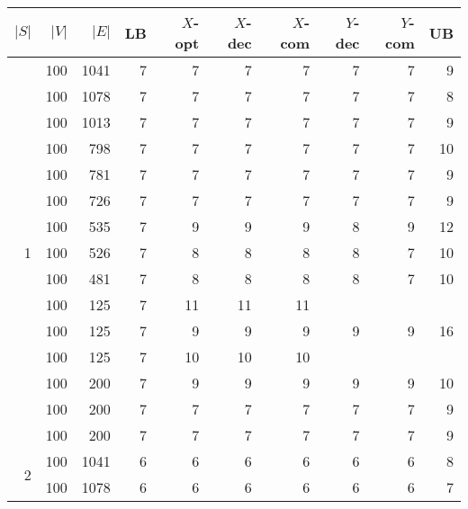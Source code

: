 \begin{table}[]
\begin{tabular}{rrrrrrrrrr}
$|S|$               & $|V|$ & $|E|$ & LB & $X$-opt & $X$-dec & $X$-com & $Y$-dec & $Y$-com & UB \\\hline
\multirow{15}{*}{1} & 100   & 1041  & 7  & 7       & 7       & 7       & 7       & 7       & 9  \\
                    & 100   & 1078  & 7  & 7       & 7       & 7       & 7       & 7       & 8  \\
                    & 100   & 1013  & 7  & 7       & 7       & 7       & 7       & 7       & 9  \\
                    & 100   & 798   & 7  & 7       & 7       & 7       & 7       & 7       & 10 \\
                    & 100   & 781   & 7  & 7       & 7       & 7       & 7       & 7       & 9  \\
                    & 100   & 726   & 7  & 7       & 7       & 7       & 7       & 7       & 9  \\
                    & 100   & 535   & 7  & 9       & 9       & 9       & 8       & 9       & 12 \\
                    & 100   & 526   & 7  & 8       & 8       & 8       & 8       & 7       & 10 \\
                    & 100   & 481   & 7  & 8       & 8       & 8       & 8       & 7       & 10 \\
                    & 100   & 125   & 7  & 11      & 11      & 11      &         &         &    \\
                    & 100   & 125   & 7  & 9       & 9       & 9       & 9       & 9       & 16 \\
                    & 100   & 125   & 7  & 10      & 10      & 10      &         &         &    \\
                    & 100   & 200   & 7  & 9       & 9       & 9       & 9       & 9       & 10 \\
                    & 100   & 200   & 7  & 7       & 7       & 7       & 7       & 7       & 9  \\
                    & 100   & 200   & 7  & 7       & 7       & 7       & 7       & 7       & 9  \\\hline
\multirow{15}{*}{2} & 100   & 1041  & 6  & 6       & 6       & 6       & 6       & 6       & 8  \\
                    & 100   & 1078  & 6  & 6       & 6       & 6       & 6       & 6       & 7  \\

\end{tabular}
\end{table}
